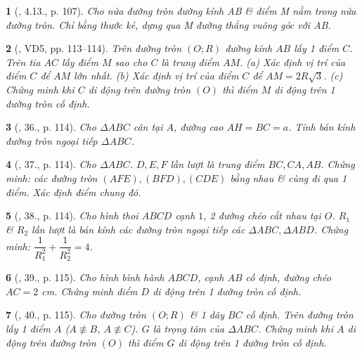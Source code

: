 \documentclass{article}
\newtheorem{baitoan}{}
\begin{document}
\begin{baitoan}[\cite{Binh_boi_duong_Toan_9_tap_1}, 4.13., p. 107]
	Cho nửa đường tròn đường kính AB \& điểm M nằm trong nửa đường tròn. Chỉ bằng thước kẻ, dựng qua M đường thẳng vuông góc với AB.
\end{baitoan}

\begin{baitoan}[\cite{Tuyen_Toan_9_old}, VD5, pp. 113--114]
	Trên đường tròn $(O;R)$ đường kính $AB$ lấy 1 điểm $C$. Trên tia $AC$ lấy điểm $M$ sao cho $C$ là trung điểm $AM$. (a) Xác định vị trí của điểm $C$ để $AM$ lớn nhất. (b) Xác định vị trí của điểm $C$ để $AM = 2R\sqrt{3}$. (c) Chứng minh khi $C$ di động trên đường tròn $(O)$ thì điểm $M$ di động trên 1 đường tròn cố định.
\end{baitoan}

\begin{baitoan}[\cite{Tuyen_Toan_9_old}, 36., p. 114]
	Cho $\Delta ABC$ cân tại $A$, đường cao $AH = BC = a$. Tính bán kính đường tròn ngoại tiếp $\Delta ABC$.
\end{baitoan}

\begin{baitoan}[\cite{Tuyen_Toan_9_old}, 37., p. 114]
	Cho $\Delta ABC$. $D,E,F$ lần lượt là trung điểm $BC,CA,AB$. Chứng minh: các đường tròn $(AFE),(BFD),(CDE)$ bằng nhau \& cùng đi qua 1 điểm. Xác định điểm chung đó.
\end{baitoan}

\begin{baitoan}[\cite{Tuyen_Toan_9_old}, 38., p. 114]
	Cho hình thoi $ABCD$ cạnh $1$, 2 đường chéo cắt nhau tại $O$. $R_1$ \& $R_2$ lần lượt là bán kính các đường tròn ngoại tiếp các $\Delta ABC,\Delta ABD$. Chứng minh: $\dfrac{1}{R_1^2} + \dfrac{1}{R_2^2} = 4$.
\end{baitoan}

\begin{baitoan}[\cite{Tuyen_Toan_9_old}, 39., p. 115]
	Cho hình bình hành $ABCD$, cạnh $AB$ cố định, đường chéo $AC = 2$ \emph{cm}. Chứng minh điểm $D$ di động trên 1 đường tròn cố định.
\end{baitoan}

\begin{baitoan}[\cite{Tuyen_Toan_9_old}, 40., p. 115]
	Cho đường tròn $(O;R)$ \& 1 dây $BC$ cố định. Trên đường tròn lấy 1 điểm $A$ ($A\not\equiv B$, $A\not\equiv C$). $G$ là trọng tâm của $\Delta ABC$. Chứng minh khi $A$ di động trên đường tròn $(O)$ thì điểm $G$ di động trên 1 đường tròn cố định.
\end{baitoan}
\end{document}
